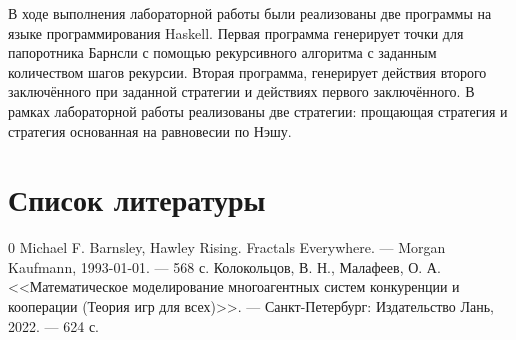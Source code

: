 \documentclass[a4paper, final]{article}
\begin{document}
	В ходе выполнения лабораторной работы были реализованы две программы на языке программирования Haskell. Первая программа генерирует точки для папоротника Барнсли с помощью рекурсивного алгоритма с заданным количеством шагов рекурсии. Вторая программа, генерирует действия второго заключённого при заданной стратегии и действиях первого заключённого. В рамках лабораторной работы реализованы две стратегии: прощающая стратегия и стратегия основанная на равновесии по Нэшу. 
	
	
	\newpage
	\section*{Список литературы}
	
	\vspace{-1.5cm}
	\begin{thebibliography}{0}
		Michael F. Barnsley, Hawley Rising. Fractals Everywhere. — Morgan Kaufmann, 1993-01-01. — 568 с.
		Колокольцов, В. Н., Малафеев, О. А. <<Математическое моделирование многоагентных систем конкуренции и кооперации (Теория игр для всех)>>. — Санкт-Петербург: Издательство Лань, 2022. — 624 с.
		
	\end{thebibliography}
	
	
\end{document}
